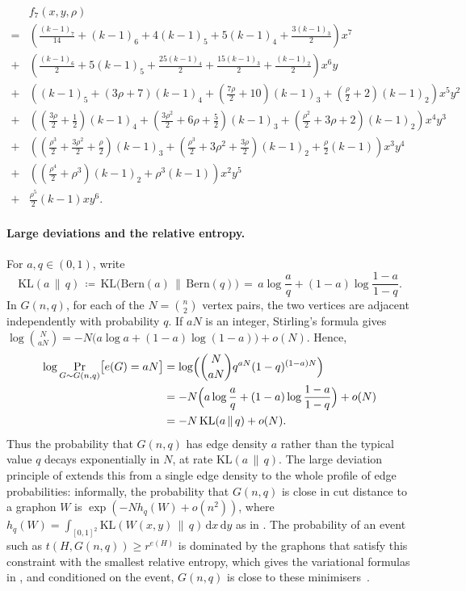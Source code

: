 \documentclass{article}
\theoremstyle{plain}
\theoremstyle{definition}
\theoremstyle{remark}
\begin{document}
\begin{align*}
  &f_7(x, y, \rho) 
  \\
  {} = &\left(\frac{(k-1)_7}{14} + (k-1)_6 + 4 (k-1)_5 + 5(k-1)_4 + \frac{3(k-1)_3}{2}\right) x^7
  \\
  {} + &\left( \frac{(k-1)_6}{2} + 5 (k-1)_5 + \frac{25(k-1)_4}{2} + \frac{15 (k-1)_3}{2} + \frac{(k-1)_2}{2} \right) x^6 y
  \\
  {} + &\left( (k-1)_5 + (3\rho + 7)(k-1)_4 + \left( \frac{7\rho}{2} + 10 \right) (k-1)_3 + \left( \frac{\rho}{2} + 2 \right) (k-1)_2 \right) x^5 y^2
  \\
  {} + &\left( \left( \frac{3 \rho}{2} + \frac{1}{2} \right) (k-1)_4 + \left( \frac{3\rho^2}{2} + 6 \rho + \frac{5}{2} \right)(k-1)_3 + \left( \frac{\rho^2}{2} + 3\rho + 2 \right)(k-1)_2\right) x^4 y^3
  \\
  {} + &\left( \left( \frac{\rho^3}{2} + \frac{3\rho^2}{2} + \frac{\rho}{2} \right)(k-1)_3 + \left( \frac{\rho^3}{2} + 3\rho^2 + \frac{3\rho}{2} \right)(k-1)_2 + \frac{\rho}{2} (k-1) \right) x^3 y^4
  \\
  {} + &\left( \left( \frac{\rho^4}{2} + \rho^3 \right) (k-1)_2 + \rho^3 (k-1) \right) x^2 y^5
  \\
  {} + & \frac{\rho^5}{2} (k-1) x y^6.
\end{align*}

\paragraph{Large deviations and the relative entropy.}
For $a, q \in (0,1)$, write
\[
\mathrm{KL}(a \,\|\, q) \,\coloneqq\, \mathrm{KL}\bigl(\mathrm{Bern}(a) \,\|\, \mathrm{Bern}(q)\bigr) \,=\, a \log\frac{a}{q} + (1-a) \log\frac{1-a}{1-q}.
\]
In $G(n, q)$, for each of the $N = \binom{n}{2}$ vertex pairs, the two vertices are adjacent independently with probability $q$. If $aN$ is an integer, Stirling's formula gives $\log\binom{N}{aN} = -N\bigl(a \log a + (1-a)\log(1-a)\bigr) + o(N)$. Hence,
\begin{align*}
\log \Pr_{G \sim G(n, q)}\bigl[e(G) = aN\bigr]
&= \log\Bigl(\binom{N}{aN} q^{aN} (1-q)^{(1-a)N}\Bigr)
\\
&= -N\Bigl(a \log\frac{a}{q} + (1-a) \log\frac{1-a}{1-q}\Bigr) + o(N)
\\
&= -N\, \mathrm{KL}(a \,\|\, q) + o(N).
\end{align*}
Thus the probability that $G(n, q)$ has edge density $a$ rather than the typical value $q$ decays exponentially in $N$, at rate $\mathrm{KL}(a \,\|\, q)$. The large deviation principle of \citet{chatterjee2011large} extends this from a single edge density to the whole profile of edge probabilities: informally, the probability that $G(n, q)$ is close in cut distance to a graphon $W$ is $\exp(-N h_q(W) + o(n^2))$, where $h_q(W) = \int_{[0,1]^2} \mathrm{KL}(W(x,y) \,\|\, q)\, \mathrm{d}x\, \mathrm{d}y$ as in . The probability of an event such as $t(H, G(n,q)) \ge r^{e(H)}$ is dominated by the graphons that satisfy this constraint with the smallest relative entropy, which gives the variational formulas in , and conditioned on the event, $G(n, q)$ is close to these minimisers~\citep{lubetzky2015replica}.
\end{document}
